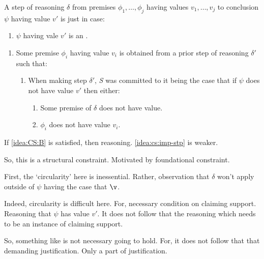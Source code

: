 \begin{note}
  \begin{idea}[\ideaCSC{}]
    \label{idea:cs:imp-stp}
    A step of reasoning \(\delta\) from premises \(\phi_{1},\dots,\phi_{j}\) having values \(v_{1}, \dots, v_{j}\) to conclusion \(\psi\) having value \(v'\) is \emph{\impotent{}} just in case:

    \begin{enumerate}
    \item \(\psi\) having vale \(v'\) is an \epAdv{}.
    \end{enumerate}

    \begin{enumerate}[resume]
    \item Some premise \(\phi_{i}\) having value \(v_{i}\) is obtained from a prior step of reasoning \(\delta'\) such that:
      \begin{enumerate}
      \item
        \label{idea:CS:B:step:commit}
        When making step \(\delta'\), \emph{S} was committed to it being the case that if \(\psi\) does not have value \(v'\) then either:
        \begin{enumerate}
        \item
          \label{idea:CS:B:step:commit:p}
          Some premise of \(\delta\) does not have value.
        \item
          \label{idea:CS:B:step:commit:c}
          \(\phi_{i}\) does not have value \(v_{i}\).
        \end{enumerate}
      \end{enumerate}
    \end{enumerate}
    \vspace{-\baselineskip}
  \end{idea}
\end{note}

\begin{note}
  If \autoref{idea:CS:B} is satisfied, then reasoning.
  \autoref{idea:cs:imp-stp} is weaker.

  So, this is a structural constraint.
  Motivated by foundational constraint.
\end{note}

\begin{note}
  First, the `circularity' here is inessential.
  Rather, observation that \(\delta\) won't apply outside of \(\psi\) having the case that \(\v\).


  Indeed, circularity is difficult here.
  For, necessary condition on claiming support.
  Reasoning that  \(\psi\) has value \(v'\).
  It does not follow that the reasoning which  needs to be an instance of claiming support.

  So, something like \citeauthor{Sgaravatti:2013wu} is not necessary going to hold.
  For, it does not follow that that demanding justification.
  Only a part of justification.
\end{note}

